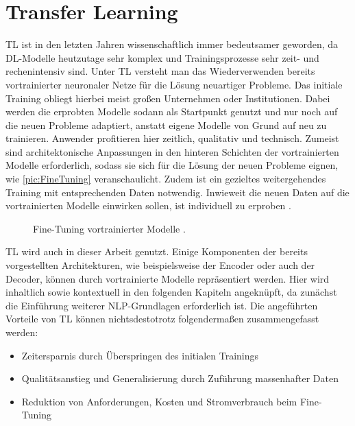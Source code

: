 \section{Transfer Learning}
\noindent
\ac{TL} ist in den letzten Jahren wissenschaftlich immer bedeutsamer geworden, da \ac{DL}-Modelle heutzutage sehr komplex und Trainingsprozesse sehr zeit- und rechenintensiv sind. Unter \ac{TL} versteht man das Wiederverwenden bereits vortrainierter neuronaler Netze für die Lösung neuartiger Probleme. Das initiale Training obliegt hierbei meist großen Unternehmen oder Institutionen. Dabei werden die erprobten Modelle sodann als Startpunkt genutzt und nur noch auf die neuen Probleme adaptiert, anstatt eigene Modelle von Grund auf neu zu trainieren. Anwender profitieren hier zeitlich, qualitativ und technisch. Zumeist sind architektonische Anpassungen in den hinteren Schichten der vortrainierten Modelle erforderlich, sodass sie sich für die Lösung der neuen Probleme eignen, wie \autoref{pic:FineTuning} veranschaulicht. Zudem ist ein gezieltes weitergehendes Training mit entsprechenden Daten notwendig. Inwieweit die neuen Daten auf die vortrainierten Modelle einwirken sollen, ist individuell zu erproben \cite[S.~554]{ZHA20}.\\

\begin{figure}[h]
  \centering
  \caption{Fine-Tuning vortrainierter Modelle \cite[S.~555]{ZHA20}.}
  \label{pic:FineTuning}
\end{figure}
\newpage

\noindent
\ac{TL} wird auch in dieser Arbeit genutzt. Einige Komponenten der bereits vorgestellten Architekturen, wie beispielsweise der Encoder oder auch der Decoder, können durch vortrainierte Modelle repräsentiert werden. Hier wird inhaltlich sowie kontextuell in den folgenden Kapiteln angeknüpft, da zunächst die Einführung weiterer \ac{NLP}-Grundlagen erforderlich ist. Die angeführten Vorteile von \ac{TL} können nichtsdestotrotz folgendermaßen zusammengefasst werden:

\begin{itemize}
	\item Zeitersparnis durch Überspringen des initialen Trainings
	\item Qualitätsanstieg und Generalisierung durch Zuführung massenhafter Daten
	\item Reduktion von Anforderungen, Kosten und Stromverbrauch beim Fine-Tuning
\end{itemize}
